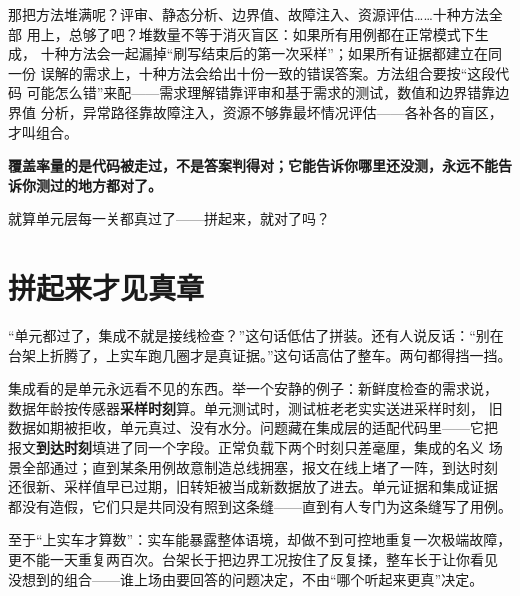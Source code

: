 那把方法堆满呢？评审、静态分析、边界值、故障注入、资源评估\ldots{}\ldots{}十种方法全部
用上，总够了吧？堆数量不等于消灭盲区：如果所有用例都在正常模式下生成，
十种方法会一起漏掉“刷写结束后的第一次采样”；如果所有证据都建立在同一份
误解的需求上，十种方法会给出十份一致的错误答案。方法组合要按“这段代码
可能怎么错”来配——需求理解错靠评审和基于需求的测试，数值和边界错靠边界值
分析，异常路径靠故障注入，资源不够靠最坏情况评估——各补各的盲区，才叫组合。

\textbf{覆盖率量的是代码被走过，不是答案判得对；它能告诉你哪里还没测，永远不能告诉你测过的地方都对了。}

就算单元层每一关都真过了——拼起来，就对了吗？

\section{拼起来才见真章}

“单元都过了，集成不就是接线检查？”这句话低估了拼装。还有人说反话：“别在
台架上折腾了，上实车跑几圈才是真证据。”这句话高估了整车。两句都得挡一挡。

集成看的是单元永远看不见的东西。举一个安静的例子：新鲜度检查的需求说，
数据年龄按传感器\textbf{采样时刻}算。单元测试时，测试桩老老实实送进采样时刻，
旧数据如期被拒收，单元真过、没有水分。问题藏在集成层的适配代码里——它把
报文\textbf{到达时刻}填进了同一个字段。正常负载下两个时刻只差毫厘，集成的名义
场景全部通过；直到某条用例故意制造总线拥塞，报文在线上堵了一阵，到达时刻
还很新、采样值早已过期，旧转矩被当成新数据放了进去。单元证据和集成证据
都没有造假，它们只是共同没有照到这条缝——直到有人专门为这条缝写了用例。

至于“上实车才算数”：实车能暴露整体语境，却做不到可控地重复一次极端故障，
更不能一天重复两百次。台架长于把边界工况按住了反复揉，整车长于让你看见
没想到的组合——谁上场由要回答的问题决定，不由“哪个听起来更真”决定。

